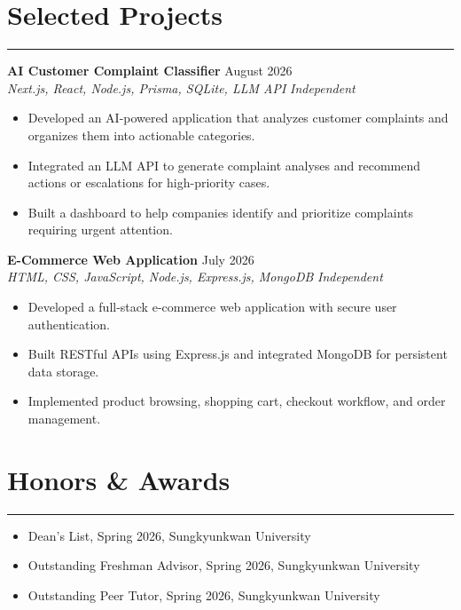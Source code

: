 \documentclass[letterpaper, 10pt]{article}
\begin{document}
\section*{Selected Projects}
\hrule
\vspace{4pt}

\textbf{AI Customer Complaint Classifier} \hfill August 2026 \\
\textit{Next.js, React, Node.js, Prisma, SQLite, LLM API}
\hfill \textit{Independent}
\begin{itemize}
    \item Developed an AI-powered application that analyzes customer complaints and organizes them into actionable categories.
    \item Integrated an LLM API to generate complaint analyses and recommend actions or escalations for high-priority cases.
    \item Built a dashboard to help companies identify and prioritize complaints requiring urgent attention.
\end{itemize}

\textbf{E-Commerce Web Application} \hfill July 2026 \\
\textit{HTML, CSS, JavaScript, Node.js, Express.js, MongoDB}
\hfill \textit{Independent}
\begin{itemize}
    \item Developed a full-stack e-commerce web application with secure user authentication.
    \item Built RESTful APIs using Express.js and integrated MongoDB for persistent data storage.
    \item Implemented product browsing, shopping cart, checkout workflow, and order management.
\end{itemize}

\section*{Honors \& Awards}
\hrule
\vspace{4pt}

\begin{itemize}
    \item Dean's List, Spring 2026, Sungkyunkwan University
    \item Outstanding Freshman Advisor, Spring 2026, Sungkyunkwan University
    \item Outstanding Peer Tutor, Spring 2026, Sungkyunkwan University
\end{itemize}
\end{document}
